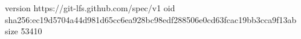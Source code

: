 version https://git-lfs.github.com/spec/v1
oid sha256:ec19d5704a44d981d65cc6ea928bc98edf288506e0cd63fcac19bb3cca9f13ab
size 53410
